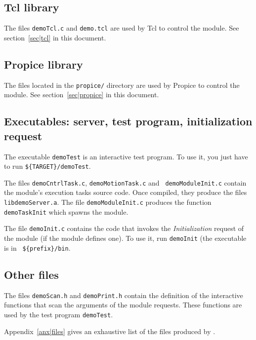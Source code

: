 \subsection{Tcl library}

The files  {\tt demoTcl.c} and {\tt demo.tcl}  are used by Tcl to control
the module. See section~\ref{sec|tcl} in this document.


\subsection{Propice library}

The files located in the {\tt propice/} directory are  used by Propice to
control the module. See section~\ref{sec|propice} in this document.


\subsection{Executables: server, test program, initialization request}

The executable {\tt demoTest} is an interactive test program. To use it,
you just have to  run
{\tt \$\{TARGET\}/demoTest}.

The  files    {\tt demoCntrlTask.c},   {\tt demoMotionTask.c}    and {\tt
demoModuleInit.c} contain the module's execution tasks source code.  Once
compiled, they produce the  files  {\tt
libdemoServer.a}.  The   file  {\tt demoModuleInit.c} produces    the
function {\tt demoTaskInit} which spawns the module.

The file {\tt demoInit.c} contains the code that invokes the {\em
Initialization} request of the module (if the module defines one). To use
it, run {\tt demoInit} (the executable is in {\tt
\$\{prefix\}/bin}.


\subsection{Other files}

The  files {\tt demoScan.h} and {\tt  demoPrint.h} contain the definition
of  the interactive   functions  that scan  the  arguments  of the module
requests. These functions are used by the test program {\tt demoTest}.

Appendix~\ref{anx|files} gives an exhaustive list  of the files  produced
by \GenoM.
